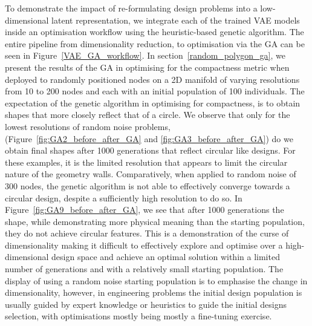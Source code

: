 \documentclass{article}
\begin{document}
To demonstrate the impact of re-formulating design problems into a low-dimensional latent representation, we integrate each of the trained VAE models inside an optimisation workflow using the heuristic-based genetic algorithm. The entire pipeline from dimensionality reduction, to optimisation via the GA can be seen in Figure~\ref{VAE_GA_workflow}. In section~\ref{random_polygon_ga}, we present the results of the GA in optimising for the compactness metric when deployed to randomly positioned nodes on a 2D manifold of varying resolutions from 10 to 200 nodes and each with an initial population of 100 individuals. The expectation of the genetic algorithm in optimising for compactness, is to obtain shapes that more closely reflect that of a circle. We observe that only for the lowest resolutions of random noise problems, (Figure~\ref{fig:GA2_before_after_GA} and \ref{fig:GA3_before_after_GA}) do we obtain final shapes after 1000 generations that reflect circular like designs. For these examples, it is the limited resolution that appears to limit the circular nature of the geometry walls. Comparatively, when applied to random noise of 300 nodes, the genetic algorithm is not able to effectively converge towards a circular design, despite a sufficiently high resolution to do so. In Figure~\ref{fig:GA9_before_after_GA}, we see that after 1000 generations the shape, while demonstrating more physical meaning than the starting population, they do not achieve circular features. This is a demonstration of the curse of dimensionality making it difficult to effectively explore and optimise over a high-dimensional design space and achieve an optimal solution within a limited number of generations and with a relatively small starting population. The display of using a random noise starting population is to emphasise the change in dimensionality, however, in engineering problems the initial design population is usually guided by expert knowledge or heuristics to guide the initial designs selection, with optimisations mostly being mostly a fine-tuning exercise. 
\end{document}
